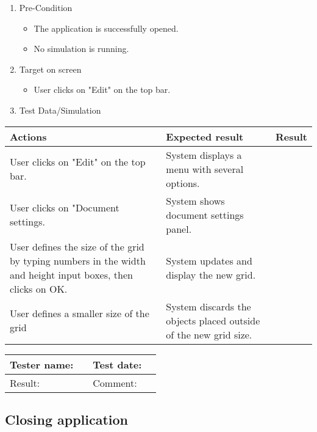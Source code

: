 \begin{enumerate}
	\item Pre-Condition
	\begin{itemize}
		\item The application is successfully opened.
		\item No simulation is running.
	\end{itemize}
	\item Target on screen
	\begin{itemize}
		\item User clicks on "Edit" on the top bar.
	\end{itemize}
	\item Test Data/Simulation
\end{enumerate}
	\begin{tabularx}{\textwidth}{|X|X|p{2.5cm}|}\hline
		Actions & Expected result & Result \\\hline
		User clicks on "Edit" on the top bar. & System displays a menu with several options.& \pass \\\hline
		User clicks on "Document settings. & System shows document settings panel. & \pass \\\hline
		User defines the size of the grid by typing numbers in the width and height input boxes, then clicks on OK.& System updates and display the new grid. & \pass \\\hline
		User defines a smaller size of the grid & System discards the objects placed outside of the new grid size. & \pass \\\hline
	\end{tabularx}
\begin{tabularx}{\textwidth}{|p{3cm}X|p{3cm}X|}\hline
	Tester name: &  & Test date: & \\\hline
	Result: &  \pass & Comment: & \\\hline
\end{tabularx}

\newpage
\subsection{Closing application}

